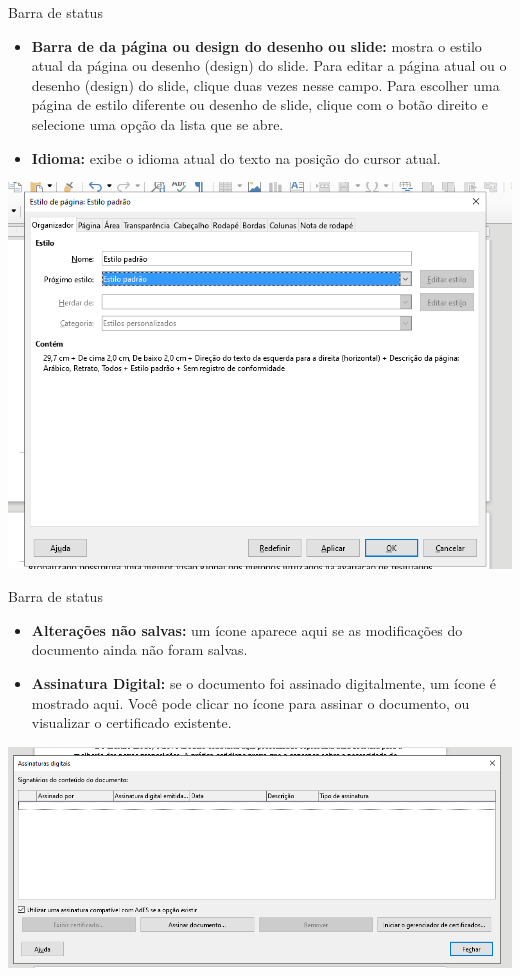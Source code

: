 \begin{frame}{Barra de status}
	\begin{block}{}
		\begin{itemize}
			\item \textbf{Barra de  da página ou design do desenho ou slide:} mostra o estilo atual da página ou desenho (design) do slide. Para editar a página atual ou o desenho (design) do slide, clique duas vezes nesse campo. Para escolher uma página de estilo diferente ou desenho de slide, clique com o botão direito e selecione uma opção da lista que se abre.
			\item \textbf{Idioma:} exibe o idioma atual do texto na posição do cursor atual.
		\end{itemize}
	\end{block}

	\centering
	\includegraphics[width=0.45\linewidth]{Figuras/Ch04/fig21}
\end{frame}


\begin{frame}{Barra de status}
	\begin{block}{}
		\begin{itemize}
			\item \textbf{Alterações não salvas:} um ícone aparece aqui se as modificações do documento ainda não foram salvas.
			\item \textbf{Assinatura Digital:} se o documento foi assinado digitalmente, um ícone é mostrado aqui. Você pode clicar no ícone para assinar o documento, ou visualizar o certificado existente.
		\end{itemize}
	\end{block}

	\medskip

	\centering
	\includegraphics[width=0.8\linewidth]{Figuras/Ch04/fig22}
\end{frame}



